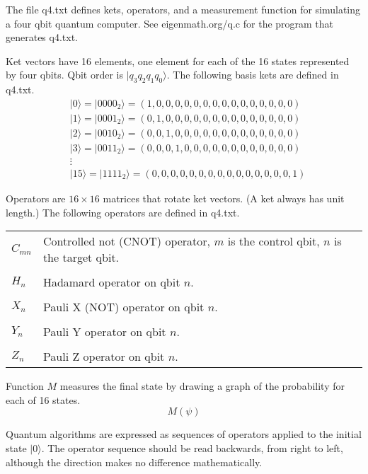 \documentclass[12pt]{article}
\begin{document}
\noindent
The file q4.txt defines kets, operators, and a measurement function
for simulating a four qbit quantum computer.
See eigenmath.org/q.c for the program that generates q4.txt.

\bigskip
\noindent
Ket vectors have 16 elements, one element for each of the 16 states represented by four qbits.
Qbit order is $|q_3 q_2 q_1 q_0\rangle$.
The following basis kets are defined in q4.txt.
\begin{align*}
&|0\rangle=|0000_2\rangle=(1,0,0,0,0,0,0,0,0,0,0,0,0,0,0,0)
\\
&|1\rangle=|0001_2\rangle=(0,1,0,0,0,0,0,0,0,0,0,0,0,0,0,0)
\\
&|2\rangle=|0010_2\rangle=(0,0,1,0,0,0,0,0,0,0,0,0,0,0,0,0)
\\
&|3\rangle=|0011_2\rangle=(0,0,0,1,0,0,0,0,0,0,0,0,0,0,0,0)
\\
&\vdots
\\
&|15\rangle=|1111_2\rangle=(0,0,0,0,0,0,0,0,0,0,0,0,0,0,0,1)
\end{align*}

\noindent
Operators are $16\times16$ matrices that rotate ket vectors.
(A ket always has unit length.)
The following operators are defined in q4.txt.

\bigskip
\begin{tabular}{l l}
$C_{mn}$ & Controlled not (CNOT) operator, $m$ is the control qbit, $n$ is the target qbit.
\\
\\
$H_n$ & Hadamard operator on qbit $n$.
\\
\\
$X_n$ & Pauli X (NOT) operator on qbit $n$.
\\
\\
$Y_n$ & Pauli Y operator on qbit $n$.
\\
\\
$Z_n$ & Pauli Z operator on qbit $n$.
\end{tabular}

\bigskip
\noindent
Function $M$ measures the final state by drawing a graph of the probability
for each of 16 states.
\begin{equation*}
M(\psi)
\end{equation*}

\noindent
Quantum algorithms are expressed as sequences of operators applied
to the initial state $|0\rangle$.
The operator sequence should be read backwards, from right to left,
although the direction makes no difference mathematically.
\end{document}
